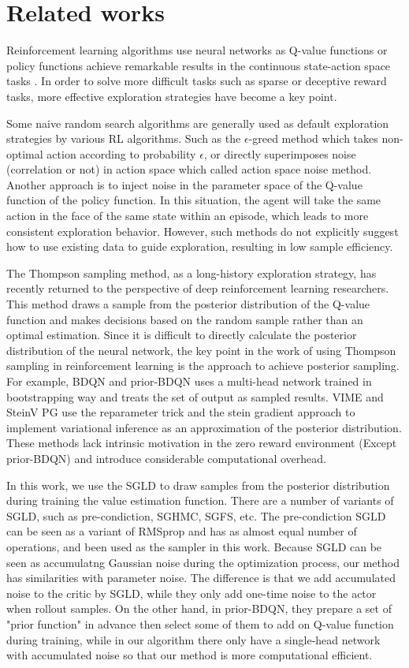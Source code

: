 \section{Related works}
Reinforcement learning algorithms use neural networks as Q-value functions or policy functions achieve remarkable results in the continuous state-action space tasks . In order to solve more difficult tasks such as sparse or deceptive reward tasks, more effective exploration strategies have become a key point.

Some naive random search algorithms are generally used as default exploration strategies by various RL algorithms. Such as the $\epsilon$-greed method which takes non-optimal action according to probability $\epsilon$, or directly superimposes noise (correlation or not) in action space which called action space noise method. Another approach is to inject noise in the parameter space of the Q-value function of the policy function. In this situation, the agent will take the same action in the face of the same state within an episode, which leads to more consistent exploration behavior. However, such methods do not explicitly suggest how to use existing data to guide exploration, resulting in low sample efficiency. 

The Thompson sampling method, as a long-history exploration strategy, has recently returned to the perspective of deep reinforcement learning researchers. This method draws a sample from the posterior distribution of the Q-value function and makes decisions based on the random sample rather than an optimal estimation. Since it is difficult to directly calculate the posterior distribution of the neural network, the key point in the work of using Thompson sampling in reinforcement learning is the approach to achieve posterior sampling. For example, BDQN and prior-BDQN uses a multi-head network trained in bootstrapping way and treats the set of output as sampled results. VIME and SteinV PG use the reparameter trick and the stein gradient approach to implement variational inference as an approximation of the posterior distribution. These methods lack intrinsic motivation in the zero reward environment (Except prior-BDQN) and introduce considerable computational overhead. 

In this work, we use the SGLD to draw samples from the posterior distribution during training the value estimation function. There are a number of variants of SGLD, such as pre-condiction, SGHMC, SGFS, etc. The pre-condiction SGLD can be seen as a variant of RMSprop and has as almost equal number of operations, and been used as the sampler in this work. Because SGLD can be seen as accumulatng Gaussian noise during the optimization process, our method has similarities with parameter noise. The difference is that we add accumulated noise to the critic by SGLD, while they only add one-time noise to the actor when rollout samples. On the other hand, in prior-BDQN, they prepare a set of "prior function" in advance then select some of them to add on Q-value function during training, while in our algorithm there only have a single-head network with accumulated noise so that our method is more computational efficient.